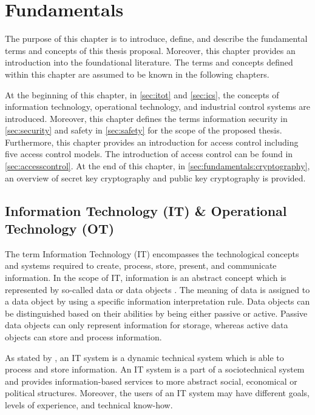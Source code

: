 \chapter{Fundamentals}
\label{ch:fundamentals}
The purpose of this chapter is to introduce, define, and describe the fundamental terms and concepts of this thesis proposal.
Moreover, this chapter provides an introduction into the foundational literature.
The terms and concepts defined within this chapter are assumed to be known in the following chapters. 

At the beginning of this chapter, in \autoref{sec:itot} and \autoref{sec:ics}, the concepts of information technology, operational technology, and industrial control systems are introduced.
Moreover, this chapter defines the terms information security in \autoref{sec:security} and safety in \autoref{sec:safety} for the scope of the proposed thesis.
Furthermore, this chapter provides an introduction for access control including five access control models.
The introduction of access control can be found in \autoref{sec:accesscontrol}.
At the end of this chapter, in \autoref{sec:fundamentals:cryptography}, an overview of secret key cryptography and public key cryptography is provided.

\section{Information Technology (IT) \& Operational Technology (OT)}
\label{sec:itot}
The term Information Technology (IT) encompasses the technological concepts and systems required to create, process, store, present, and communicate information.
In the scope of IT, information is an abstract concept which is represented by so-called data or data objects \cite{Eckert2023}.
The meaning of data is assigned to a data object by using a specific information interpretation rule.
Data objects can be distinguished based on their abilities by being either passive or active.
Passive data objects can only represent information for storage, whereas active data objects can store and process information.

As stated by \citeauthor{Eckert2023} \cite{Eckert2023}, an IT system is a dynamic technical system which is able to process and store information.
An IT system is a part of a sociotechnical system and provides information-based services to more abstract social, economical or political structures.
Moreover, the users of an IT system may have different goals, levels of experience, and technical know-how.

